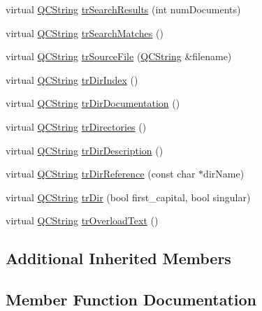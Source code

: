 \begin{DoxyCompactItemize}
\item 
virtual \mbox{\hyperlink{class_q_c_string}{Q\+C\+String}} \mbox{\hyperlink{class_translator_norwegian_ad29c3555c4f77e08afde69b18aa3a984}{tr\+Search\+Results}} (int num\+Documents)
\item 
virtual \mbox{\hyperlink{class_q_c_string}{Q\+C\+String}} \mbox{\hyperlink{class_translator_norwegian_ad58212ebc2e1025eeb79a01886127697}{tr\+Search\+Matches}} ()
\item 
virtual \mbox{\hyperlink{class_q_c_string}{Q\+C\+String}} \mbox{\hyperlink{class_translator_norwegian_a44037b33f2a36b7216344c99a79d1f1e}{tr\+Source\+File}} (\mbox{\hyperlink{class_q_c_string}{Q\+C\+String}} \&filename)
\item 
virtual \mbox{\hyperlink{class_q_c_string}{Q\+C\+String}} \mbox{\hyperlink{class_translator_norwegian_a023f19a8e39b52387205eb1b1e7fb98d}{tr\+Dir\+Index}} ()
\item 
virtual \mbox{\hyperlink{class_q_c_string}{Q\+C\+String}} \mbox{\hyperlink{class_translator_norwegian_aecd4fc64d2bf3623d639fb05d0d3bf86}{tr\+Dir\+Documentation}} ()
\item 
virtual \mbox{\hyperlink{class_q_c_string}{Q\+C\+String}} \mbox{\hyperlink{class_translator_norwegian_ab62df548b3f87c04dd9a263ebe28af0e}{tr\+Directories}} ()
\item 
virtual \mbox{\hyperlink{class_q_c_string}{Q\+C\+String}} \mbox{\hyperlink{class_translator_norwegian_a41b6a277e42ca439c34de6fecace9118}{tr\+Dir\+Description}} ()
\item 
virtual \mbox{\hyperlink{class_q_c_string}{Q\+C\+String}} \mbox{\hyperlink{class_translator_norwegian_aaec5ad35b4a4ca35da01d49ec5c2d163}{tr\+Dir\+Reference}} (const char $\ast$dir\+Name)
\item 
virtual \mbox{\hyperlink{class_q_c_string}{Q\+C\+String}} \mbox{\hyperlink{class_translator_norwegian_a460793e99d45997ac35f98ffbfa447c1}{tr\+Dir}} (bool first\+\_\+capital, bool singular)
\item 
virtual \mbox{\hyperlink{class_q_c_string}{Q\+C\+String}} \mbox{\hyperlink{class_translator_norwegian_a9cf7fd5998841687bedaabdc534521b2}{tr\+Overload\+Text}} ()
\end{DoxyCompactItemize}
\subsection*{Additional Inherited Members}


\subsection{Member Function Documentation}
\mbox{\label{class_translator_norwegian_ad8188dd029fae2e63022d332ab71d448}} 
